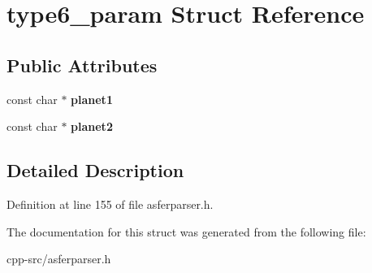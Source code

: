 \hypertarget{structtype6__param}{\section{type6\-\_\-param Struct Reference}
\label{structtype6__param}
}
\subsection*{Public Attributes}
\begin{DoxyCompactItemize}
\item 
\hypertarget{structtype6__param_a1af5e3b1e9841c4c4b1df0879a72ebea}{const char $\ast$ {\bfseries planet1}}\label{structtype6__param_a1af5e3b1e9841c4c4b1df0879a72ebea}

\item 
\hypertarget{structtype6__param_a48a65ddf9e1959a48d958d42922b6e8c}{const char $\ast$ {\bfseries planet2}}\label{structtype6__param_a48a65ddf9e1959a48d958d42922b6e8c}

\end{DoxyCompactItemize}


\subsection{Detailed Description}


Definition at line 155 of file asferparser.\-h.



The documentation for this struct was generated from the following file\-:\begin{DoxyCompactItemize}
\item 
cpp-\/src/asferparser.\-h\end{DoxyCompactItemize}
